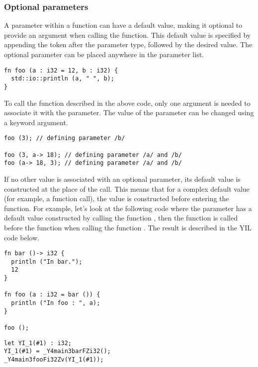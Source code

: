 \subsubsection {Optional parameters}

A parameter within a function can have a default value, making it optional to
provide an argument when calling the function. This default value is specified
by appending the \token{=} token after the parameter type, followed by the
desired value. The optional parameter can be placed anywhere in the parameter
list.
\bigskip

\begin{lstlisting}[style=coloredverbatim]
fn foo (a : i32 = 12, b : i32) {
  std::io::println (a, " ", b);
}
\end{lstlisting}

To call the  function described in the above code, only one argument
is needed to associate it with the  parameter. The value of the
parameter can be changed using a keyword argument.

\begin{lstlisting}[style=coloredverbatim]
foo (3); // defining parameter /b/

foo (3, a-> 18); // defining parameter /a/ and /b/
foo (a-> 18, 3); // defining parameter /a/ and /b/
\end{lstlisting}

If no other value is associated with an optional parameter, its default value is
constructed at the place of the call. This means that for a complex default
value (for example, a function call), the value is constructed before entering
the function. For example, let's look at the following code where the parameter
 has a default value constructed by calling the function ,
then the function  is called before the function  when
calling the function . The result is described in the YIL code
below.

\begin{lstlisting}[style=coloredverbatim]
fn bar ()-> i32 {
  println ("In bar.");
  12
}

fn foo (a : i32 = bar ()) {
  println ("In foo : ", a);
}

foo ();
\end{lstlisting}

\begin{lstlisting}[style=intermediateVerb]
let YI_1(#1) : i32;
YI_1(#1) = _Y4main3barFZi32();
_Y4main3fooFi32Zv(YI_1(#1));
\end{lstlisting}

